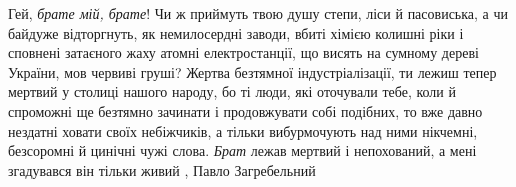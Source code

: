 Гей, \emph{брате мій, брате}! Чи ж приймуть твою душу степи, ліси й пасовиська, а чи
байдуже відторгнуть, як немилосердні заводи, вбиті хімією колишні ріки і
сповнені затаєного жаху атомні електростанції, що висять на сумному дереві
України, мов червиві груші? Жертва безтямної індустріалізації, ти лежиш тепер
мертвий у столиці нашого народу, бо ті люди, які оточували тебе, коли й
спроможні ще безтямно зачинати і продовжувати собі подібних, то вже давно
нездатні ховати своїх небіжчиків, а тільки вибурмочують над ними нікчемні,
безсоромні й цинічні чужі слова.  \emph{Брат} лежав мертвий і непохований, а мені
згадувався він тільки живий
, Павло Загребельний 
